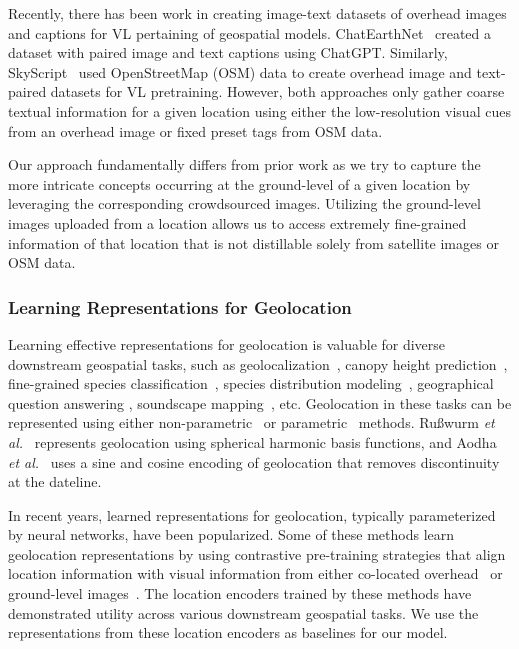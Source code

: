 Recently, there has been work in creating image-text datasets of overhead images and captions for VL pertaining of geospatial models. ChatEarthNet~\cite{yuan2024chatearthnet} created a dataset with paired image and text captions using ChatGPT. Similarly, SkyScript~\cite{wang2023skyscript} used OpenStreetMap (OSM) data to create overhead image and text-paired datasets for VL pretraining. However, both approaches only gather coarse textual information for a given location using either the low-resolution visual cues from an overhead image or fixed preset tags from OSM data.

Our approach fundamentally differs from prior work as we try to capture the more intricate concepts occurring at the ground-level of a given location by leveraging the corresponding crowdsourced images. Utilizing the ground-level images uploaded from a location allows us to access extremely fine-grained information of that location that is not distillable solely from satellite images or OSM data.  

\subsubsection{Learning Representations for Geolocation}
Learning effective representations for geolocation is valuable for diverse downstream geospatial tasks, such as geolocalization~\cite{vivanco2024geoclip}, canopy height prediction~\cite{lang2023high}, fine-grained species classification~\cite{Aodha_2019_ICCV,sastry2024birdsat}, species distribution modeling~\cite{cole2023spatial, sastry2024birdsat}, geographical question answering \cite{mai2020se}, soundscape mapping~\cite{khanal2024psm}, etc. Geolocation in these tasks can be represented using either non-parametric~\cite{gaolearning, russwurm2023geographic} or parametric~\cite{mai2023csp,vivanco2024geoclip,klemmer2023satclip} methods.
Ru{\ss}wurm \textit{et al.}~\cite{russwurm2023geographic} represents geolocation using spherical harmonic basis functions, and Aodha \textit{et al.}~\cite{Aodha_2019_ICCV} uses a sine and cosine encoding of geolocation that removes discontinuity at the dateline.

In recent years, learned representations for geolocation, typically parameterized by neural networks, have been popularized. Some of these methods learn geolocation representations by using contrastive pre-training strategies that align location information with visual information from either co-located overhead~\cite{klemmer2023satclip,mai2023csp} or ground-level images~\cite{mai2023csp,vivanco2024geoclip}. The location encoders trained by these methods have demonstrated utility across various downstream geospatial tasks. We use the representations from these location encoders as baselines for our model.

